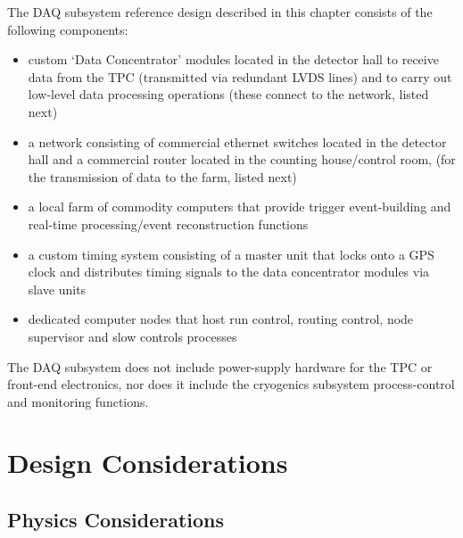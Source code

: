 The DAQ subsystem reference design described in this chapter 
consists of the following components:
\begin{itemize}
  \item custom `Data Concentrator' modules located in the detector hall to 
        receive data from the TPC (transmitted via redundant LVDS lines) 
        and to carry out low-level data processing operations (these connect 
        to the network, listed next)
  \item a network consisting of commercial ethernet switches located 
        in the detector hall and a commercial router located in the 
        counting house/control room, (for the transmission of data to the farm, listed next)
  \item a local farm of commodity computers that provide trigger 
        event-building and 
        real-time processing/event reconstruction functions
  \item a custom timing system consisting of a master unit that locks onto a 
        GPS clock and distributes timing signals to the data concentrator 
        modules via slave units 
  \item dedicated computer nodes that host run control, routing control, 
        node supervisor and slow controls processes
\end{itemize}
%
The DAQ subsystem does not include power-supply hardware 
for the TPC or front-end electronics, nor does it include the 
cryogenics subsystem process-control and monitoring functions.


\section{Design Considerations}

\subsection{Physics Considerations}

